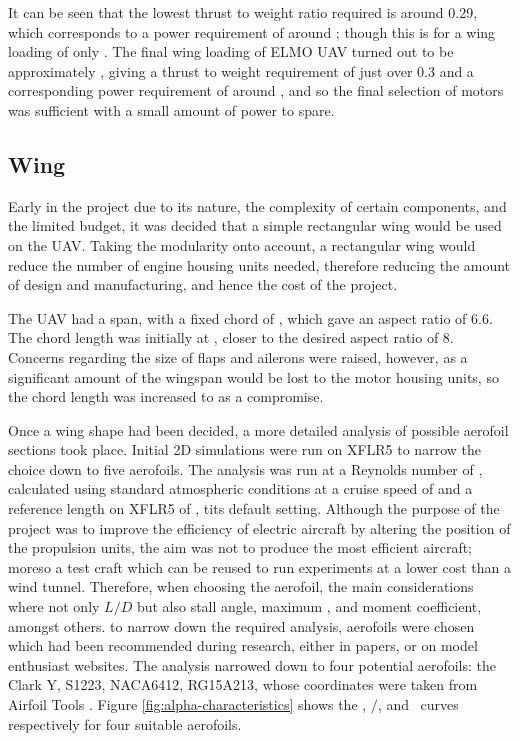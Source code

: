 \documentclass[../../main.tex]{subfiles}
\begin{document}
It can be seen that the lowest thrust to weight ratio required is around 0.29, which corresponds to a power requirement of around ; though this is for a wing loading of only .
The final wing loading of ELMO UAV turned out to be approximately , giving a thrust to weight requirement of just over 0.3 and a corresponding power requirement of around , and so the final selection of motors was sufficient with a small amount of power to spare. 

\subsection{Wing} \label{sec:design-process:preliminary-design:wing}

Early in the project due to its nature, the complexity of certain components, and the limited budget, it was decided that a simple rectangular wing would be used on the UAV.
Taking the modularity onto account, a rectangular wing would reduce the number of engine housing units needed, therefore reducing the amount of design and manufacturing, and hence the cost of the project. 

The UAV had a  span, with a fixed chord of , which gave an aspect ratio of 6.6.
The chord length was initially at , closer to the desired aspect ratio of 8.
Concerns regarding the size of flaps and ailerons were raised, however, as a significant amount of the wingspan would be lost to the motor housing units, so the chord length was increased to  as a compromise.  

Once a wing shape had been decided, a more detailed analysis of possible aerofoil sections took place.
Initial 2D simulations were run on XFLR5 \cite{xflr-19} to narrow the choice down to five aerofoils.
The analysis was run at a Reynolds number of , calculated using standard atmospheric conditions at a cruise speed of  and a reference length on XFLR5 of , tits default setting.
Although the purpose of the project was to improve the efficiency of electric aircraft by altering the position of the propulsion units, the aim was not to produce the most efficient aircraft; moreso a test craft which can be reused to run experiments at a lower cost than a wind tunnel.
Therefore, when choosing the aerofoil, the main considerations where not only $L/D$ but also stall angle, maximum \cl, and moment coefficient, amongst others. to narrow down the required analysis, aerofoils were chosen which had been recommended during research, either in papers, or on model enthusiast websites.
The analysis narrowed down to four potential aerofoils: the Clark Y, S1223, NACA6412, RG15A213, whose coordinates were taken from Airfoil Tools \cite{airfoil-tools-19}.
Figure \ref{fig:alpha-characteristics} shows the \cl, \cl$/$\cd, and \cm\, curves respectively for four suitable aerofoils. 
\end{document}
